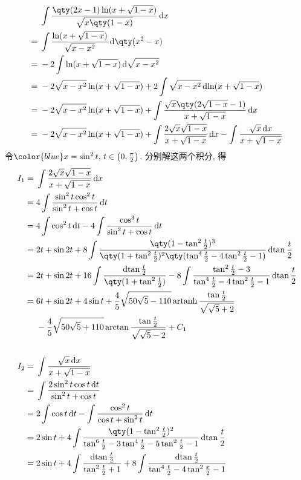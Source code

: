 \documentclass{ctexbook}
\DeclareMathOperator{\artanh}{artanh}
\newcommand*{\dif}{\mathop{}\!\mathrm{d}}
\begin{document}
{\begin{align*}
{}&\int\frac{\qty(2x-1)\ln(x+\sqrt{1-x})}{\sqrt{x\qty(1-x)}}\dif{x}\\
={}&\int\frac{\ln(x+\sqrt{1-x})}{\sqrt{x-x^{2}}}\dif{\qty(x^{2}-x)}\\
={}&-2\int\ln(x+\sqrt{1-x})\dif{\sqrt{x-x^{2}}}\\
={}&-2\sqrt{x-x^{2}}\ln(x+\sqrt{1-x})+2\int\sqrt{x-x^{2}}\dif{\ln(x+\sqrt{1-x})}\\
={}&-2\sqrt{x-x^{2}}\ln(x+\sqrt{1-x})+\int\frac{\sqrt{x}\qty(2\sqrt{1-x}-1)}{x+\sqrt{1-x}}\dif{x}\\
={}&-2\sqrt{x-x^{2}}\ln(x+\sqrt{1-x})+\int\frac{2\sqrt{x}\sqrt{1-x}}{x+\sqrt{1-x}}\dif{x}-\int\frac{\sqrt{x}\dif{x}}{x+\sqrt{1-x}}
\end{align*}
令$\color{blue}x=\sin^{2}{t},\,t\in\left(0,\frac{\pi}{2}\right)$. 分别解这两个积分, 得
\begin{align*}
I_{1}={}&\int\frac{2\sqrt{x}\sqrt{1-x}}{x+\sqrt{1-x}}\dif{x}\\
={}&4\int\frac{\sin^{2}{t}\cos^{2}{t}}{\sin^{2}{t}+\cos{t}}\dif{t}\\
={}&4\int\cos^{2}{t}\dif{t}-4\int\frac{\cos^{3}{t}}{\sin^{2}{t}+\cos{t}}\dif{t}\\
={}&2t+\sin{2t}+8\int\frac{\qty(1-\tan^{2}{\frac{t}{2}})^{3}}{\qty(1+\tan^{2}{\frac{t}{2}})^{2}\qty(\tan^{4}{\frac{t}{2}}-4\tan^{2}{\frac{t}{2}}-1)}\dif{\tan{\frac{t}{2}}}\\
={}&2t+\sin{2t}+16\int\frac{\dif{\tan{\frac{t}{2}}}}{\qty(1+\tan^{2}{\frac{t}{2}})}-8\int\frac{\tan^{2}{\frac{t}{2}}-3}{\tan^{4}{\frac{t}{2}}-4\tan^{2}{\frac{t}{2}}-1}\dif{\tan{\frac{t}{2}}}\\
={}&6t+\sin{2t}+4\sin{t}+\frac{4}{5}\sqrt{50\sqrt{5}-110}\artanh{\frac{\tan{\frac{t}{2}}}{\sqrt{\sqrt{5}+2}}}\\
{}&-\frac{4}{5}\sqrt{50\sqrt{5}+110}\arctan{\frac{\tan{\frac{t}{2}}}{\sqrt{\sqrt{5}-2}}}+C_{1}\\
\\
I_{2}={}&\int\frac{\sqrt{x}\dif{x}}{x+\sqrt{1-x}}\\
={}&\int\frac{2\sin^{2}{t}\cos{t}\dif{t}}{\sin^{2}{t}+\cos{t}}\\
={}&2\int\cos{t}\dif{t}-\int\frac{\cos^{2}{t}}{\cos{t}+\sin^{2}{t}}\dif{t}\\
={}&2\sin{t}+4\int\frac{\qty(1-\tan^{2}{\frac{t}{2}})^{2}}{\tan^{6}{\frac{t}{2}}-3\tan^{4}{\frac{t}{2}}-5\tan^{2}{\frac{t}{2}}-1}\dif{\tan{\frac{t}{2}}}\\
={}&2\sin{t}+4\int\frac{\dif{\tan{\frac{t}{2}}}}{\tan^{2}{\frac{t}{2}}+1}+8\int\frac{\dif{\tan{\frac{t}{2}}}}{\tan^{4}{\frac{t}{2}}-4\tan^{2}{\frac{x}{2}}-1}\\

\end{align*}}
\end{document}
